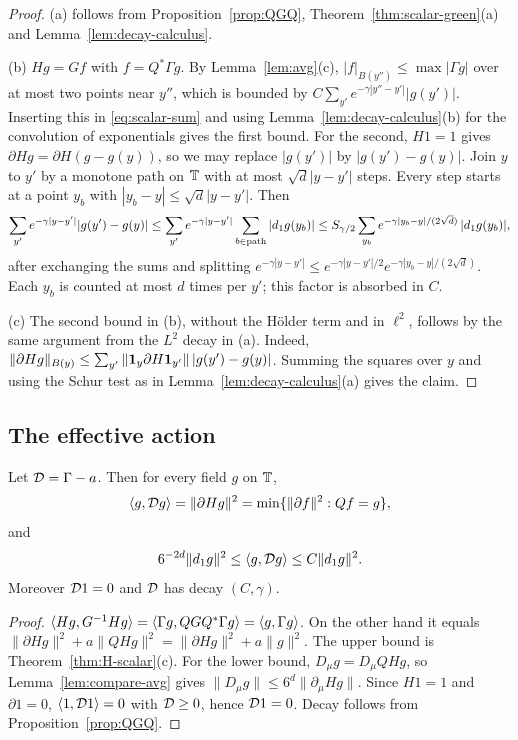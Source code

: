 \begin{proof}
(a) follows from Proposition~\ref{prop:QGQ}, Theorem~\ref{thm:scalar-green}(a) and Lemma~\ref{lem:decay-calculus}.

(b) $Hg=Gf$ with $f=Q^*\Gamma g$. By Lemma~\ref{lem:avg}(c), $|f|_{B(y'')}\le\max|\Gamma g|$ over at most two points near $y''$, which is bounded by $C\sum_{y'}e^{-\gamma|y''-y'|}|g(y')|$. Inserting this in \eqref{eq:scalar-sum} and using Lemma~\ref{lem:decay-calculus}(b) for the convolution of exponentials gives the first bound. For the second, $H1=1$ gives $\partial Hg=\partial H(g-g(y))$, so we may replace $|g(y')|$ by $|g(y')-g(y)|$. Join $y$ to $y'$ by a monotone path on $\mathbb T$ with at most $\sqrt d|y-y'|$ steps. Every step starts at a point $y_b$ with $|y_b-y|\le\sqrt d|y-y'|$. Then
\[
\sum_{y'}e^{-\gamma|y-y'|}|g(y')-g(y)|\le\sum_{y'}e^{-\gamma|y-y'|}\sum_{b\in\text{path}}|d_1 g(y_b)|\le S_{\gamma/2}\sum_{y_b}e^{-\gamma|y_b-y|/(2\sqrt d)}\,|d_1 g(y_b)|,
\]
after exchanging the sums and splitting $e^{-\gamma|y-y'|}\le e^{-\gamma|y-y'|/2}e^{-\gamma|y_b-y|/(2\sqrt d)}$. Each $y_b$ is counted at most $d$ times per $y'$; this factor is absorbed in $C$.

(c) The second bound in (b), without the H\"older term and in $\ell^2$, follows by the same argument from the $L^2$ decay in (a). Indeed, $\|\partial Hg\|_{B(y)}\le\sum_{y'}\|\mathbf 1_y\partial H\mathbf 1_{y'}\|\,|g(y')-g(y)|$. Summing the squares over $y$ and using the Schur test as in Lemma~\ref{lem:decay-calculus}(a) gives the claim.
\end{proof}

\subsection{The effective action}\label{ss:8.3}

\begin{proposition}\label{prop:eff-action-scalar}
Let $\mathcal D=\Gamma-a$. Then for every field $g$ on $\mathbb T$,
\[
\langle g,\mathcal D g\rangle=\|\partial Hg\|^2=\min\{\|\partial f\|^2:Qf=g\},
\]
and
\[
6^{-2d}\|d_1 g\|^2\le\langle g,\mathcal D g\rangle\le C\|d_1 g\|^2 .
\]
Moreover $\mathcal D1=0$ and $\mathcal D$ has decay $(C,\gamma)$.
\end{proposition}

\begin{proof}
$\langle Hg,G^{-1}Hg\rangle=\langle \Gamma g,QGQ^*\Gamma g\rangle=\langle g,\Gamma g\rangle$. On the other hand it equals $\|\partial Hg\|^2+a\|QHg\|^2=\|\partial Hg\|^2+a\|g\|^2$. The upper bound is Theorem~\ref{thm:H-scalar}(c). For the lower bound, $D_\mu g=D_\mu QHg$, so Lemma~\ref{lem:compare-avg} gives $\|D_\mu g\|\le6^d\|\partial_\mu Hg\|$. Since $H1=1$ and $\partial1=0$, $\langle 1,\mathcal D1\rangle=0$ with $\mathcal D\ge0$, hence $\mathcal D1=0$. Decay follows from Proposition~\ref{prop:QGQ}.
\end{proof}

